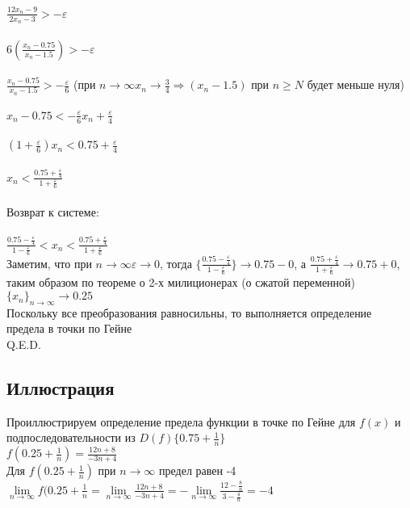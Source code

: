 \documentclass{article}
\begin{document}
$\frac{12x_n - 9}{2x_n - 3} > - \varepsilon$ \\ \\
$6(\frac{x_n - 0.75}{x_n - 1.5}) > - \varepsilon$ \\ \\ 
$\frac{x_n - 0.75}{x_n - 1.5} > - \frac{\varepsilon}{6}$ (при $n \to \infty x_n \to \frac{3}{4} \Rightarrow (x_n - 1.5)$ при $n \geq N$ будет меньше нуля) \\ \\
$x_n - 0.75 < - \frac{\varepsilon}{6}x_n + \frac{\varepsilon}{4}$ \\ \\
$(1 + \frac{\varepsilon}{6})x_n < 0.75 + \frac{\varepsilon}{4}$ \\ \\
$x_n < \frac{0.75 + \frac{\varepsilon}{4}}{1 + \frac{\varepsilon}{6}}$ \\ \\
Возврат к системе: \\ \\
$\frac{0.75 - \frac{\varepsilon}{4}}{1 - \frac{\varepsilon}{6}} < x_n < \frac{0.75 + \frac{\varepsilon}{4}}{1 + \frac{\varepsilon}{6}}$ \\
Заметим, что при $n \to \infty \varepsilon \to 0$, тогда $\{\frac{0.75 - \frac{\varepsilon}{4}}{1 - \frac{\varepsilon}{6}}\} \to 0.75 -0$, а $\frac{0.75 + \frac{\varepsilon}{4}}{1 + \frac{\varepsilon}{6}} \to 0.75 +0$, таким образом по теореме о 2-х милиционерах (о сжатой переменной) \\
$\{x_n\}_{n \to \infty} \to 0.25$ \\
Поскольку все преобразования равносильны, то выполняется определение предела в точки по Гейне \\
Q.E.D.

\subsection{Иллюстрация}
Проиллюстрируем определение предела функции в точке по Гейне для $f(x)$ и подпоследовательности из $D(f) \{0.75 + \frac{1}{n}\}$ \\
$f(0.25 + \frac{1}{n}) = \frac{12n + 8}{-3n + 4}$ \\
Для $f(0.25 + \frac{1}{n})$ при $n \to \infty$ предел равен -4 \\
$\lim\limits_{n \to \infty} f(0.25 + \frac{1}{n} = \lim\limits_{n \to \infty} \frac{12n + 8}{-3n + 4} = - \lim\limits_{n \to \infty} \frac{12 - \frac{8}{n}}{3 - \frac{4}{n}} = -4$
\end{document}
